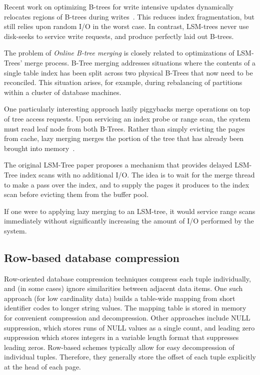 \documentclass{sig-alternate-sigmod08}
\begin{document}
Recent work on optimizing B-trees for write intensive updates dynamically
relocates regions of B-trees during
writes~\cite{bTreeHighUpdateRates}.  This reduces index fragmentation,
but still relies upon random I/O in the worst case.  In contrast,
LSM-trees never use disk-seeks to service write requests, and produce
perfectly laid out B-trees.

The problem of {\em Online B-tree merging} is closely related to
optimizations of LSM-Trees' merge process.  B-Tree merging addresses
situations where the contents of a single table index has been split
across two physical B-Trees that now need to be reconciled.  This
situation arises, for example, during rebalancing of partitions within
a cluster of database machines.

One particularly interesting approach lazily piggybacks merge
operations on top of tree access requests.  Upon servicing an index
probe or range scan, the system must read leaf node from both B-Trees.
Rather than simply evicting the pages from cache, lazy merging merges
the portion of the tree that has already been brought into
memory~\cite{onlineMerging}.

The original LSM-Tree paper proposes a mechanism that provides delayed
LSM-Tree index scans with no additional I/O.  The idea is to wait for
the merge thread to make a pass over the index, and to supply the
pages it produces to the index scan before evicting them from the
buffer pool.

If one were to applying lazy merging to an LSM-tree, it would service
range scans immediately without significantly increasing the amount of
I/O performed by the system.

\subsection{Row-based database compression}

Row-oriented database compression techniques compress each tuple
individually, and (in some cases) ignore similarities between adjacent
data items.  One such approach (for low cardinality data) builds a
table-wide mapping from short identifier codes to longer string
values. The mapping table is stored in memory for convenient
compression and decompression.  Other approaches include NULL
suppression, which stores runs of NULL values as a single count, and
leading zero suppression which stores integers in a variable length
format that suppresses leading zeros.  Row-based schemes typically
allow for easy decompression of individual tuples.  Therefore, they
generally store the offset of each tuple explicitly at the head of
each page.
\end{document}
